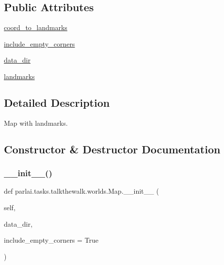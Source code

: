 \subsection*{Public Attributes}
\begin{DoxyCompactItemize}
\item 
\hyperlink{classparlai_1_1tasks_1_1talkthewalk_1_1worlds_1_1Map_af3a12a8efd0afe26740e2b9b7a362614}{coord\+\_\+to\+\_\+landmarks}
\item 
\hyperlink{classparlai_1_1tasks_1_1talkthewalk_1_1worlds_1_1Map_a8d069664effce0d3bf691ff46e6e76fc}{include\+\_\+empty\+\_\+corners}
\item 
\hyperlink{classparlai_1_1tasks_1_1talkthewalk_1_1worlds_1_1Map_afdf228371d0f141ece9b3889faabe095}{data\+\_\+dir}
\item 
\hyperlink{classparlai_1_1tasks_1_1talkthewalk_1_1worlds_1_1Map_a11ed4a0cac5c44b1a61dc702378e5b9f}{landmarks}
\end{DoxyCompactItemize}


\subsection{Detailed Description}
\begin{DoxyVerb}Map with landmarks.
\end{DoxyVerb}
 

\subsection{Constructor \& Destructor Documentation}
\mbox{\label{classparlai_1_1tasks_1_1talkthewalk_1_1worlds_1_1Map_a09c659a2c010b978fb69b4f578088e3b}} 
\subsubsection{\texorpdfstring{\+\_\+\+\_\+init\+\_\+\+\_\+()}{\_\_init\_\_()}}
{\footnotesize\ttfamily def parlai.\+tasks.\+talkthewalk.\+worlds.\+Map.\+\_\+\+\_\+init\+\_\+\+\_\+ (\begin{DoxyParamCaption}\item[{}]{self,  }\item[{}]{data\+\_\+dir,  }\item[{}]{include\+\_\+empty\+\_\+corners = {\ttfamily True} }\end{DoxyParamCaption})}



